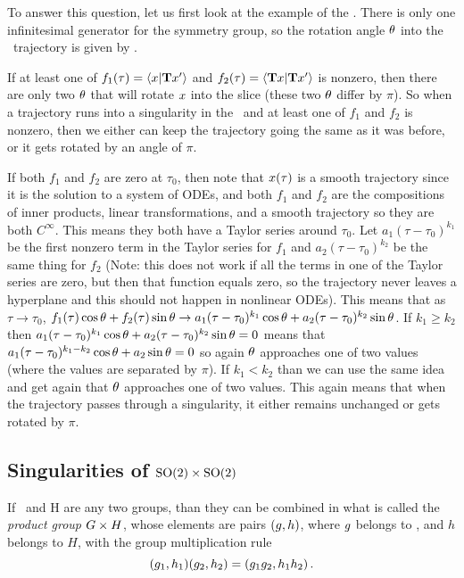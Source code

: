 {To answer this question, let us first look at the example of the \cLe. There is only one infinitesimal generator for the  symmetry group, so the rotation angle ${\bf \theta}$ into the \reducedsp\ trajectory is given by .

If at least one of $f_1(\tau)=\left\langle {\ensuremath{x}}|{\mathbf{T} x'} \right\rangle$ and $f_2(\tau)=\left\langle {\ensuremath{\mathbf{T}}\ensuremath{x}}|{\mathbf{T} x'} \right\rangle$ is nonzero, then there are only two ${\bf \theta}$ that will rotate $x$ into the slice (these two ${\bf \theta}$ differ by $\pi$). So when a trajectory runs into a singularity in the \reducedsp\ and at least one of $f_1$ and $f_2$ is nonzero, then we either can keep the trajectory going the same as it was before, or it gets rotated by an angle of $\pi$.

If both $f_1$ and $f_2$ are zero at $\tau_0$, then note that $x(\tau)$ is a smooth trajectory since it is the solution to a system of ODEs, and both $f_1$ and $f_2$ are the compositions of inner products, linear transformations, and a smooth trajectory so they are both $C^{\infty}$. This means they both have a Taylor series around $\tau_0$. Let $a_1 (\tau-\tau_0)^{k_1}$ be the first nonzero term in the Taylor series for $f_1$ and $a_2 (\tau-\tau_0)^{k_2}$ be the same thing for $f_2$ (Note: this does not work if all the terms in one of the Taylor series are zero, but then that function equals zero, so the trajectory never leaves a hyperplane and this should not happen in nonlinear ODEs). This means that as $\tau \rightarrow \tau_0$, $f_1(\tau)\cos{\bf \theta}+f_2(\tau)\sin{\bf \theta} \rightarrow a_1 (\tau-\tau_0)^{k_1}\cos{\bf \theta}+a_2 (\tau-\tau_0)^{k_2}\sin{\bf \theta}$. If $k_1 \geq k_2$ then $a_1 (\tau-\tau_0)^{k_1}\cos{\bf \theta}+a_2 (\tau-\tau_0)^{k_2}\sin{\bf \theta}=0$ means that $a_1 (\tau-\tau_0)^{k_1-k_2}\cos{\bf \theta}+a_2\sin{\bf \theta}=0$ so again ${\bf \theta}$ approaches one of two values (where the values are separated by $\pi$). If $k_1 < k_2$ than we can use the same idea and get again that ${\bf \theta}$ approaches one of two values. This again means that when the trajectory passes through a singularity, it either remains unchanged or gets rotated by $\pi$.

\subsection{Singularities of $\textrm{SO}(2) \times \textrm{SO}(2)$}

                                                    \toCB
If \Group\ and H are any two groups, than they can be combined in
what is called the {\em product group} $G \times H$, whose
elements are pairs $(g,h)$, where $g$ belongs to \Group, and 
$h$ belongs to $H$, with the group multiplication rule
\[
(g_1,h_1)(g_2,h_2)=(g_1 g_2,h_1 h_2)
\,.
\]


}
